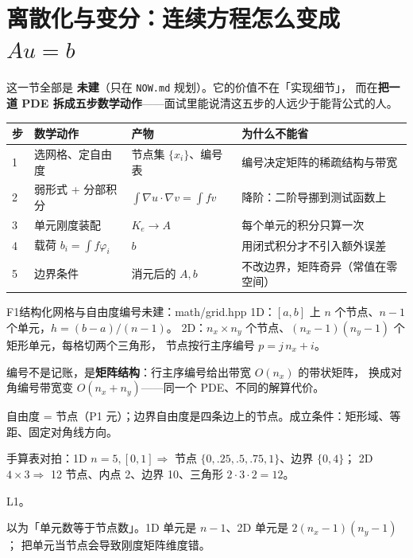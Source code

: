 \section{离散化与变分：连续方程怎么变成 $Au=b$}

这一节全部是 \textbf{未建}（只在 \texttt{NOW.md} 规划）。它的价值不在「实现细节」，
而在\textbf{把一道 PDE 拆成五步数学动作}——面试里能说清这五步的人远少于能背公式的人。

\begin{center}
\begin{tabular}{L{1.1cm}L{3.2cm}L{4.0cm}L{5.2cm}}
\toprule
步 & 数学动作 & 产物 & 为什么不能省 \\
 & 选网格、定自由度 & 节点集 $\{x_i\}$、编号表 & 编号决定矩阵的稀疏结构与带宽 \\
2 & 弱形式 + 分部积分 & $\int\nabla u\cdot\nabla v=\int fv$ & 降阶：二阶导挪到测试函数上 \\
3 & 单元刚度装配 & $K_e\to A$ & 每个单元的积分只算一次 \\
4 & 载荷 $b_i=\int f\varphi_i$ & $b$ & 用闭式积分才不引入额外误差 \\
5 & 边界条件 & 消元后的 $A,b$ & 不改边界，矩阵奇异（常值在零空间）\\
\bottomrule
\end{tabular}
\end{center}

\begin{know}{F1}{结构化网格与自由度编号}{未建：math/grid.hpp}
 1D：$[a,b]$ 上 $n$ 个节点、$n-1$ 个单元，$h=(b-a)/(n-1)$。
2D：$n_x\times n_y$ 个节点、$(n_x-1)(n_y-1)$ 个矩形单元，每格切两个三角形，
节点按行主序编号 $p=j\,n_x+i$。

 编号不是记账，是\textbf{矩阵结构}：行主序编号给出带宽 $O(n_x)$ 的带状矩阵，
换成对角编号带宽变 $O(n_x+n_y)$——同一个 PDE、不同的解算代价。

 自由度 = 节点（P1 元）；边界自由度是四条边上的节点。成立条件：矩形域、等距、固定对角线方向。

 手算表对拍：1D $n=5,[0,1]\Rightarrow$ 节点 $\{0,.25,.5,.75,1\}$、边界 $\{0,4\}$；
2D $4\times3\Rightarrow$ 12 节点、内点 2、边界 10、三角形 $2\cdot3\cdot2=12$。

 L1。

 以为「单元数等于节点数」。1D 单元是 $n-1$、2D 单元是 $2(n_x-1)(n_y-1)$；
把单元当节点会导致刚度矩阵维度错。
\end{know}


